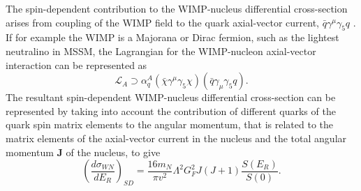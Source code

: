 The spin-dependent contribution to the WIMP-nucleus differential cross-section arises from coupling of the WIMP field to the quark axial-vector current, $\bar{q}\gamma^{\mu}\gamma_{5}q$ \cite{Jungman_1996}. If for example the WIMP is a Majorana or Dirac fermion, such as the lightest neutralino in MSSM, the Lagrangian for the WIMP-nucleon axial-vector interaction can be represented as
%
\begin{equation} \label{eq:axial_vector_lagrangian}
   \mathcal{L}_{A} \supset \alpha^{A}_{q} (\bar{\chi}\gamma^{\mu}\gamma_{5}\chi) (\bar{q}\gamma_{\mu}\gamma_{5}q). 
\end{equation}
%
The resultant spin-dependent WIMP-nucleus differential cross-section can be represented by taking into account the contribution of different quarks of the quark spin matrix elements to the angular momentum, that is related to the matrix elements of the axial-vector current in the nucleus and the total angular momentum $\boldsymbol{J}$ of the nucleus, to give
%
\begin{equation} \label{eq:nuclear_matrix_element}
   	\left(\frac{d\sigma_{WN}}{dE_{R}}\right)_{SD} = \frac{16m_{N}}{\pi{}v^{2}}\Lambda^2G^{2}_{F}J(J+1)\frac{S(E_{R})}{S(0)}.
\end{equation}
%
